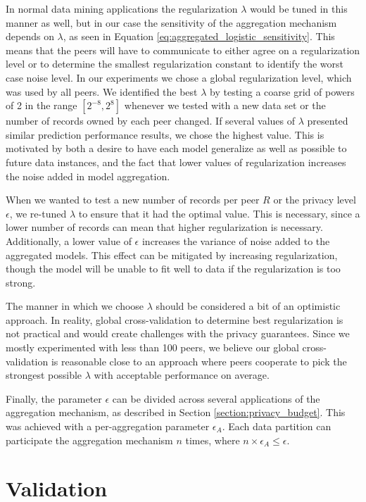 In normal data mining applications the regularization $\lambda$ would be tuned in this manner as well, but in our case the sensitivity of the aggregation mechanism depends on $\lambda$, as seen in Equation \ref{eq:aggregated_logistic_sensitivity}. This means that the peers will have to communicate to either agree on a regularization level or to determine the smallest regularization constant to identify the worst case noise level. In our experiments we chose a global regularization level, which was used by all peers. We identified the best $\lambda$ by testing a coarse grid of powers of 2 in the range $[2^{-8}, 2^{8}]$ whenever we tested with a new data set or the number of records owned by each peer changed. If several values of $\lambda$ presented similar prediction performance results, we chose the highest value. This is motivated by both a desire to have each model generalize as well as possible to future data instances, and the fact that lower values of regularization increases the noise added in model aggregation.

When we wanted to test a new number of records per peer $R$ or the privacy level $\epsilon$, we re-tuned $\lambda$ to ensure that it had the optimal value. This is necessary, since a lower number of records can mean that higher regularization is necessary. Additionally, a lower value of $\epsilon$ increases the variance of noise added to the aggregated models. This effect can be mitigated by increasing regularization, though the model will be unable to fit well to data if the regularization is too strong.

The manner in which we choose $\lambda$ should be considered a bit of an optimistic approach. In reality, global cross-validation to determine best regularization is not practical and would create challenges with the privacy guarantees. Since we mostly experimented with less than 100 peers, we believe our global cross-validation is reasonable close to an approach where peers cooperate to pick the strongest possible $\lambda$ with acceptable performance on average.

Finally, the parameter $\epsilon$ can be divided across several applications of the aggregation mechanism, as described in Section \ref{section:privacy_budget}. This was achieved with a per-aggregation parameter $\epsilon_A$. Each data partition can participate the aggregation mechanism $n$ times, where $n \times \epsilon_A \leq \epsilon$.

\section{Validation}

